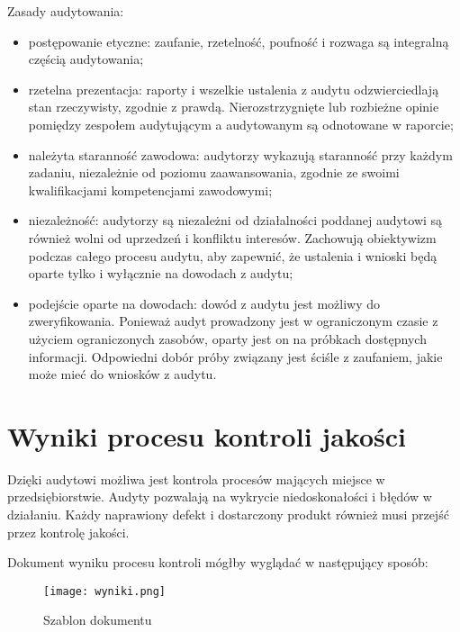 Zasady audytowania:
\begin{itemize}
\item postępowanie etyczne:  zaufanie, rzetelność, poufność i rozwaga są integralną częścią audytowania;
\item rzetelna prezentacja: raporty i wszelkie ustalenia z audytu odzwierciedlają stan rzeczywisty, zgodnie z prawdą. Nierozstrzygnięte lub rozbieżne opinie pomiędzy zespołem audytującym a audytowanym są odnotowane w raporcie;
\item należyta staranność zawodowa: audytorzy wykazują staranność przy każdym zadaniu, niezależnie od poziomu zaawansowania, zgodnie ze swoimi kwalifikacjami kompetencjami zawodowymi;
\item niezależność:  audytorzy są niezależni od działalności poddanej audytowi są również wolni od uprzedzeń i konfliktu interesów. Zachowują obiektywizm podczas całego procesu audytu, aby zapewnić, że ustalenia i wnioski będą oparte tylko i wyłącznie na dowodach z audytu;
\item podejście oparte na dowodach:  dowód z audytu jest możliwy do zweryfikowania. Ponieważ audyt prowadzony jest w ograniczonym czasie z użyciem ograniczonych zasobów, oparty jest on na próbkach dostępnych informacji. Odpowiedni dobór próby związany jest ściśle z zaufaniem, jakie może mieć do wniosków z audytu.
\end{itemize}

\clearpage


\section{Wyniki procesu kontroli jakości}
Dzięki audytowi możliwa jest kontrola procesów mających miejsce w przedsiębiorstwie. Audyty pozwalają na wykrycie niedoskonałości i błędów w działaniu. Każdy naprawiony defekt i dostarczony produkt również musi przejść przez kontrolę jakości. 

Dokument wyniku procesu kontroli mógłby wyglądać w następujący sposób:

\begin{figure}[!h]
\begin{center}
\texttt{[image: wyniki.png]}
\caption[Szablon dokumentu]{Szablon dokumentu}
\label{rysunekProces}
\end{center}
\end{figure}

